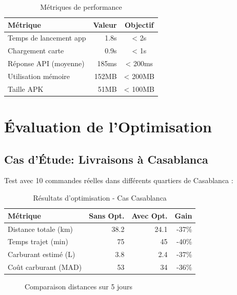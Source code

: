 \documentclass[12pt,a4paper]{report}
\begin{document}
\begin{table}[H]
\centering
\begin{tabular}{|l|r|c|}
\hline
\textbf{Métrique} & \textbf{Valeur} & \textbf{Objectif} \\
\hline
Temps de lancement app & 1.8s & < 2s \\
Chargement carte & 0.9s & < 1s \\
Réponse API (moyenne) & 185ms & < 200ms \\
Utilisation mémoire & 152MB & < 200MB \\
Taille APK & 51MB & < 100MB \\
\hline
\end{tabular}
\caption{Métriques de performance}
\end{table}

\section{Évaluation de l'Optimisation}

\subsection{Cas d'Étude: Livraisons à Casablanca}

Test avec 10 commandes réelles dans différents quartiers de Casablanca :

\begin{table}[H]
\centering
\begin{tabular}{|l|r|r|r|}
\hline
\textbf{Métrique} & \textbf{Sans Opt.} & \textbf{Avec Opt.} & \textbf{Gain} \\
\hline
Distance totale (km) & 38.2 & 24.1 & -37\% \\
Temps trajet (min) & 75 & 45 & -40\% \\
Carburant estimé (L) & 3.8 & 2.4 & -37\% \\
Coût carburant (MAD) & 53 & 34 & -36\% \\
\hline
\end{tabular}
\caption{Résultats d'optimisation - Cas Casablanca}
\end{table}

\begin{figure}[H]
\centering
{}
\caption{Comparaison distances sur 5 jours}
\end{figure}
\end{document}
